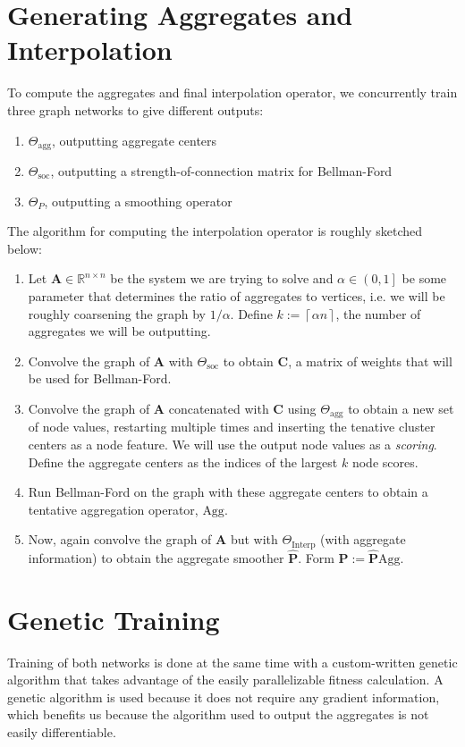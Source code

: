 \documentclass{article}
\newcommand{\mat}[1]{\bm{{#1}}}
\newcommand{\ceil}[1]{\left\lceil #1 \right\rceil}
\begin{document}
\section{Generating Aggregates and Interpolation}
To compute the aggregates and final interpolation operator, we concurrently train three graph networks to give different outputs:
\begin{enumerate}
\item $\Theta_{\text{agg}}$, outputting aggregate centers
\item $\Theta_{\text{soc}}$, outputting a strength-of-connection matrix for Bellman-Ford
\item $\Theta_{P}$, outputting a smoothing operator
\end{enumerate}
The algorithm for computing the interpolation operator is roughly sketched below:
\begin{enumerate}
\item Let $\mat{A} \in \mathbb{R}^{n \times n}$ be the system we are trying to solve and $\alpha \in \left(0, 1\right]$ be some parameter that determines the ratio of aggregates to vertices, i.e. we will be roughly coarsening the graph by $1/\alpha$.  Define $k := \ceil{\alpha n}$, the number of aggregates we will be outputting.
\item Convolve the graph of $\mat{A}$ with $\Theta_{\text{soc}}$ to obtain $\mat{C}$, a matrix of weights that will be used for Bellman-Ford.
\item Convolve the graph of $\mat{A}$ concatenated with $\mat{C}$ using $\Theta_{\text{agg}}$ to obtain a new set of node values, restarting multiple times and inserting the tenative cluster centers as a node feature.  We will use the output node values as a \textit{scoring}.  Define the aggregate centers as the indices of the largest $k$ node scores.
\item Run Bellman-Ford on the graph with these aggregate centers to obtain a tentative aggregation operator, $\text{Agg}$.
\item Now, again convolve the graph of $\mat{A}$ but with $\Theta_{\text{Interp}}$ (with aggregate information) to obtain the aggregate smoother $\mat{\hat{P}}$.  Form $\mat{P} := \mat{\hat{P}}\text{Agg}$.
\end{enumerate}

\section{Genetic Training}
Training of both networks is done at the same time with a custom-written genetic algorithm that takes advantage of the easily parallelizable fitness calculation.  A genetic algorithm is used because it does not require any gradient information, which benefits us because the algorithm used to output the aggregates is not easily differentiable.
\end{document}
